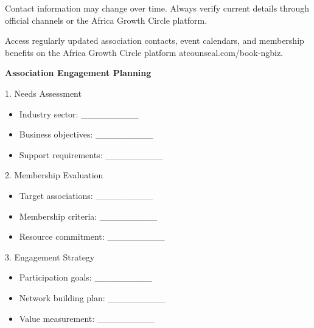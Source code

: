 \begin{warningbox}
Contact information may change over time. Always verify current details through official channels or the Africa Growth Circle platform.
\end{warningbox}

\vspace{1em}

\begin{communitybox}
Access regularly updated association contacts, event calendars, and membership benefits on the Africa Growth Circle platform atcounseal.com/book-ngbiz.
\end{communitybox}

\vspace{1em}

\begin{workshopbox}
\textbf{Association Engagement Planning}

1. Needs Assessment
\begin{itemize}[leftmargin=*]
    \item Industry sector: \_\_\_\_\_\_\_\_\_
    \item Business objectives: \_\_\_\_\_\_\_\_\_
    \item Support requirements: \_\_\_\_\_\_\_\_\_
\end{itemize}

2. Membership Evaluation
\begin{itemize}[leftmargin=*]
    \item Target associations: \_\_\_\_\_\_\_\_\_
    \item Membership criteria: \_\_\_\_\_\_\_\_\_
    \item Resource commitment: \_\_\_\_\_\_\_\_\_
\end{itemize}

3. Engagement Strategy
\begin{itemize}[leftmargin=*]
    \item Participation goals: \_\_\_\_\_\_\_\_\_
    \item Network building plan: \_\_\_\_\_\_\_\_\_
    \item Value measurement: \_\_\_\_\_\_\_\_\_
\end{itemize}
\end{workshopbox}